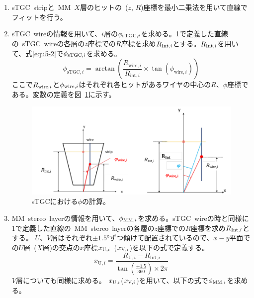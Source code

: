 \begin{enumerate}
    \item sTGC~stripと~MM~$X$層のヒットの~($z$, $R$)座標を最小二乗法を用いて直線でフィットを行う。
    \item sTGC~wireの情報を用いて、$i$層の$\phi_{{\rm{sTGC}},i}$を求める。1で定義した直線の~sTGC~wireの各層の$z$座標での$R$座標を求め$R_{{\rm{Int}},i}$とする。$R_{{\rm{Int}},i}$を用いて、式\eqref{equ5-2}で$\phi_{{\rm{sTGC}},i}$を求める。
    \begin{equation}
        \phi_{\mathrm{sTGC},i}=\arctan\left(\frac{R_{\mathrm{wire},i}}{R_{\mathrm{int},i}} \times \tan(\phi_{\mathrm{wire},i})\right)\label{equ5-2}
    \end{equation}
    ここで$R_{{\rm{wire}},i}$と$\phi_{{\rm{wire}},i}$はそれぞれ各ヒットがあるワイヤの中心の$R$、$\phi$座標である。変数の定義を図~\ref{fig:5-2}に示す。
    
    \begin{figure}[H]
        \centering
        \includegraphics[clip, width=12cm]{fig/5/sTGC_phi.png}
        \caption{sTGCにおける$\phi$の計算\cite{article:noguchi}。}
        \label{fig:5-2}
    \end{figure}
        
    \item MM~stereo~layerの情報を用いて、$\phi_{{\rm{MM}},i}$を求める。sTGC~wireの時と同様に1で定義した直線の~MM~stereo~layerの各層の$z$座標での$R$座標を求め$R_{{\rm{Int}},i}$とする。
    $U$、$V$層はそれぞれ$\pm\si{\ang{1.5}}$ずつ傾けて配置されているので、$x-y$平面での$U$層~($X$層)の交点の$x$座標$x_{{\rm{U}},i}$~($x_{{\rm{V}},i}$)を以下の式で定義する。
    \begin{equation}
        x_{\mathrm{U},i}=\frac{R_{\mathrm{U},i}-R_{\mathrm{Int},i}}{\tan(\frac{+1.5}{360}) \times 2\pi}\label{equ5-3}
    \end{equation}
    $V$層についても同様に求める。
    $x_{{\rm{U}},i}$($x_{{\rm{V}},i}$)を用いて、以下の式で$\phi_{{\rm{MM}},i}$を求める。
    

\end{enumerate}

